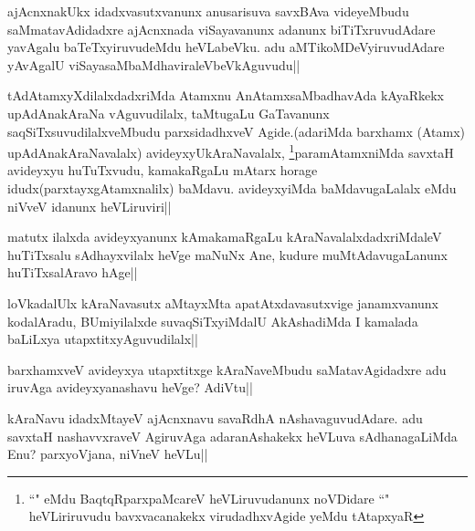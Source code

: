 \begin{artha}
ajAcnxnakUkx idadxvasutxvanunx anusarisuva savxBAva videyeMbudu saMmatavAdidadxre ajAcnxnada viSayavanunx adanunx biTiTxruvudAdare yavAgalu baTeTxyiruvudeMdu heVLabeVku. adu aMTikoMDeVyiruvudAdare yAvAgalU viSayasaMbaMdhaviraleVbeVkAguvudu||
\end{artha}


\begin{artha}
tAdAtamxyXdilalxdadxriMda Atamxnu AnAtamxsaMbadhavAda kAyaRkekx upAdAnakAraNa vAguvudilalx, taMtugaLu GaTavanunx saqSiTxsuvudilalxveMbudu parxsidadhxveV Agide.(adariMda barxhamx (Atamx) upAdAnakAraNavalalx) avideyxyUkAraNavalalx, \footnote[1]{``\stext" eMdu BaqtqRparxpaMcareV heVLiruvudanunx noVDidare ``\stext" heVLiriruvudu bavxvacanakekx virudadhxvAgide yeMdu tAtapxyaR}paramAtamxniMda savxtaH avideyxyu huTuTxvudu, kamakaRgaLu mAtarx horage idudx(parxtayxgAtamxnalilx) baMdavu. avideyxyiMda baMdavugaLalalx eMdu niVveV idanunx heVLiruviri||
\end{artha}


\begin{artha}
matutx ilalxda avideyxyanunx kAmakamaRgaLu kAraNavalalxdadxriMdaleV huTiTxsalu 
sAdhayxvilalx heVge maNuNx Ane, kudure muMtAdavugaLanunx huTiTxsalAravo hAge||
\end{artha}

\begin{artha}
loVkadalUlx kAraNavasutx aMtayxMta apatAtxdavasutxvige janamxvanunx kodalAradu, BUmiyilalxde suvaqSiTxyiMdalU AkAshadiMda I kamalada baLiLxya utapxtitxyAguvudilalx||
\end{artha}

\begin{artha}
barxhamxveV avideyxya  utapxtitxge kAraNaveMbudu saMatavAgidadxre adu iruvAga avideyxyanashavu heVge? AdiVtu||
\end{artha}

\begin{artha}
kAraNavu idadxMtayeV ajAcnxnavu savaRdhA nAshavaguvudAdare. adu savxtaH nashavvxraveV AgiruvAga adaranAshakekx heVLuva sAdhanagaLiMda Enu? parxyoVjana, niVneV heVLu||
\end{artha}


